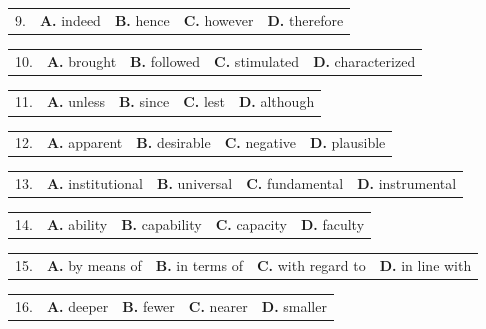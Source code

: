\documentclass[UTF8,11pt]{ctexart}
\begin{document}
\noindent\begin{tabularx}{\linewidth}{@{}lXXXX@{}}9. & \textbf{A.} indeed & \textbf{B.} hence & \textbf{C.} however & \textbf{D.} therefore\\\end{tabularx}\par

\noindent\begin{tabularx}{\linewidth}{@{}lXXXX@{}}10. & \textbf{A.} brought & \textbf{B.} followed & \textbf{C.} stimulated & \textbf{D.} characterized\\\end{tabularx}\par

\noindent\begin{tabularx}{\linewidth}{@{}lXXXX@{}}11. & \textbf{A.} unless & \textbf{B.} since & \textbf{C.} lest & \textbf{D.} although\\\end{tabularx}\par

\noindent\begin{tabularx}{\linewidth}{@{}lXXXX@{}}12. & \textbf{A.} apparent & \textbf{B.} desirable & \textbf{C.} negative & \textbf{D.} plausible\\\end{tabularx}\par

\noindent\begin{tabularx}{\linewidth}{@{}lXXXX@{}}13. & \textbf{A.} institutional & \textbf{B.} universal & \textbf{C.} fundamental & \textbf{D.} instrumental\\\end{tabularx}\par

\noindent\begin{tabularx}{\linewidth}{@{}lXXXX@{}}14. & \textbf{A.} ability & \textbf{B.} capability & \textbf{C.} capacity & \textbf{D.} faculty\\\end{tabularx}\par

\noindent\begin{tabularx}{\linewidth}{@{}lXXXX@{}}15. & \textbf{A.} by means of & \textbf{B.} in terms of & \textbf{C.} with regard to & \textbf{D.} in line with\\\end{tabularx}\par

\noindent\begin{tabularx}{\linewidth}{@{}lXXXX@{}}16. & \textbf{A.} deeper & \textbf{B.} fewer & \textbf{C.} nearer & \textbf{D.} smaller\\\end{tabularx}\par
\end{document}
